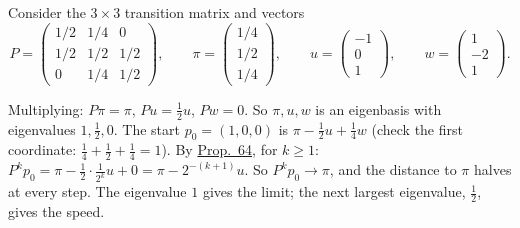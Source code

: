 \documentclass[10pt]{scrartcl}
\begin{document}
\begin{example*}
  Consider the $3\times 3$ transition matrix and vectors
  \[
    P=\begin{pmatrix}1/2&1/4&0\\1/2&1/2&1/2\\0&1/4&1/2\end{pmatrix},\qquad
    \pi=\begin{pmatrix}1/4\\1/2\\1/4\end{pmatrix},\qquad
    u=\begin{pmatrix}-1\\0\\1\end{pmatrix},\qquad
    w=\begin{pmatrix}1\\-2\\1\end{pmatrix}.
  \]
  \begin{steps}
    \ii Multiplying: $P\pi=\pi$, $Pu=\frac12u$, $Pw=0$. So $\pi,u,w$ is an eigenbasis with eigenvalues $1,\frac12,0$.
    \ii The start $p_0=(1,0,0)$ is $\pi-\frac12u+\frac14w$ (check the first coordinate: $\frac14+\frac12+\frac14=1$).
    \ii By \hyperref[prop-64]{Prop.~64}, for $k\ge1$: $P^kp_0=\pi-\frac12\cdot\frac1{2^k}u+0=\pi-2^{-(k+1)}u$.
    \ii So $P^kp_0\to\pi$, and the distance to $\pi$ halves at every step. The eigenvalue $1$ gives the limit; the next largest eigenvalue, $\frac12$, gives the speed.
  \end{steps}
\end{example*}
\end{document}
